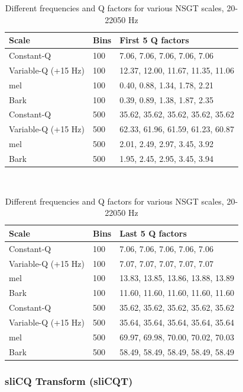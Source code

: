 \documentclass[report.tex]{subfiles}
\begin{document}
\begin{table}[ht]
\begin{tabular}{ |l|l|p{9cm}| }
	 \hline
	 Scale & Bins & First 5 Q factors \\
	 \hline
	 \hline
	 Constant-Q & 100 & 7.06, 7.06, 7.06, 7.06, 7.06  \\
	 \hline
	 Variable-Q (+15 Hz) & 100 & 12.37, 12.00, 11.67, 11.35, 11.06 \\
	 \hline
	 mel & 100 & 0.40, 0.88, 1.34, 1.78, 2.21 \\
	 \hline
	 Bark & 100 & 0.39, 0.89, 1.38, 1.87, 2.35 \\
	 \hline
	 Constant-Q & 500 & 35.62, 35.62, 35.62, 35.62, 35.62 \\
	 \hline
	 Variable-Q (+15 Hz) & 500 & 62.33, 61.96, 61.59, 61.23, 60.87 \\
	 \hline
	 mel & 500 & 2.01, 2.49, 2.97, 3.45, 3.92 \\
	 \hline
	 Bark & 500 & 1.95, 2.45, 2.95, 3.45, 3.94 \\
	 \hline
\end{tabular}\\
\vspace{1em}
\begin{tabular}{ |l|l|p{9cm}| }
	 \hline
	 Scale & Bins & Last 5 Q factors \\
	 \hline
	 \hline
	 Constant-Q & 100 & 7.06, 7.06, 7.06, 7.06, 7.06  \\
	 \hline
	 Variable-Q (+15 Hz) & 100 & 7.07, 7.07, 7.07, 7.07, 7.07 \\
	 \hline
	 mel & 100 & 13.83, 13.85, 13.86, 13.88, 13.89 \\
	 \hline
	 Bark & 100 & 11.60, 11.60, 11.60, 11.60, 11.60 \\
	 \hline
	 Constant-Q & 500 & 35.62, 35.62, 35.62, 35.62, 35.62 \\
	 \hline
	 Variable-Q (+15 Hz) & 500 & 35.64, 35.64, 35.64, 35.64, 35.64 \\
	 \hline
	 mel & 500 & 69.97, 69.98, 70.00, 70.02, 70.03 \\
	 \hline
	 Bark & 500 & 58.49, 58.49, 58.49, 58.49, 58.49 \\
	 \hline
\end{tabular}
	\caption{Different frequencies and Q factors for various NSGT scales, 20-22050 Hz}
	\label{table:nsgtfreqsandqs}
\end{table}

\newpagefill

\subsubsection{sliCQ Transform (sliCQT)}
\label{sec:theoryslicqt}
\end{document}
